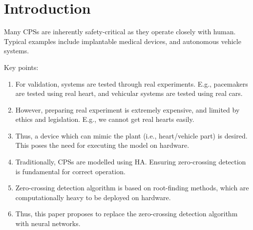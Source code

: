 \section{Introduction}
Many \acp{CPS} are inherently safety-critical as they operate closely with human. Typical examples include implantable medical devices, and autonomous vehicle systems. 

Key points:
\begin{enumerate}
	\item For validation, systems are tested through real experiments. E.g., pacemakers are tested using real heart, and vehicular systems are tested using real cars.
	\item However, preparing real experiment is extremely expensive, and limited by ethics and legislation. E.g., we cannot get real hearts easily. 
	\item Thus, a device which can mimic the plant (i.e., heart/vehicle part) is desired. This poses the need for executing the model on hardware. 
	\item Traditionally, \acp{CPS} are modelled using \ac{HA}. Ensuring zero-crossing detection is fundamental for correct operation.
	\item Zero-crossing detection algorithm is based on root-finding methods, which are computationally heavy to be deployed on hardware.
	\item Thus, this paper proposes to replace the zero-crossing detection algorithm with neural networks.
\end{enumerate}


